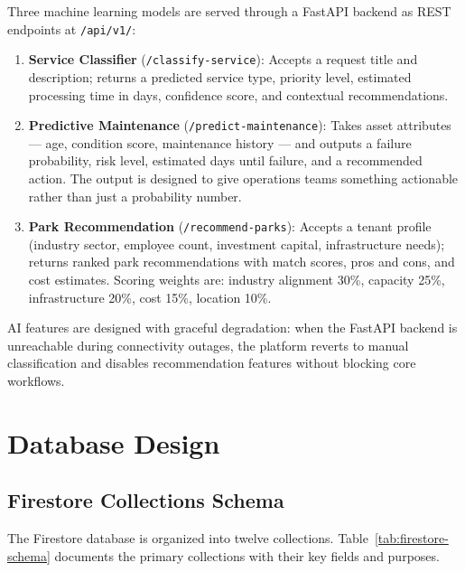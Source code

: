 Three machine learning models are served through a FastAPI backend as REST endpoints at \texttt{/api/v1/}:

\begin{enumerate}
\item \textbf{Service Classifier} (\texttt{/classify-service}): Accepts a request title and description; returns a predicted service type, priority level, estimated processing time in days, confidence score, and contextual recommendations.
\item \textbf{Predictive Maintenance} (\texttt{/predict-maintenance}): Takes asset attributes --- age, condition score, maintenance history --- and outputs a failure probability, risk level, estimated days until failure, and a recommended action. The output is designed to give operations teams something actionable rather than just a probability number.
\item \textbf{Park Recommendation} (\texttt{/recommend-parks}): Accepts a tenant profile (industry sector, employee count, investment capital, infrastructure needs); returns ranked park recommendations with match scores, pros and cons, and cost estimates. Scoring weights are: industry alignment 30\%, capacity 25\%, infrastructure 20\%, cost 15\%, location 10\%.
\end{enumerate}

AI features are designed with graceful degradation: when the FastAPI backend is unreachable during connectivity outages, the platform reverts to manual classification and disables recommendation features without blocking core workflows.

\section{Database Design}

\subsection{Firestore Collections Schema}

The Firestore database is organized into twelve collections. Table~\ref{tab:firestore-schema} documents the primary collections with their key fields and purposes.

